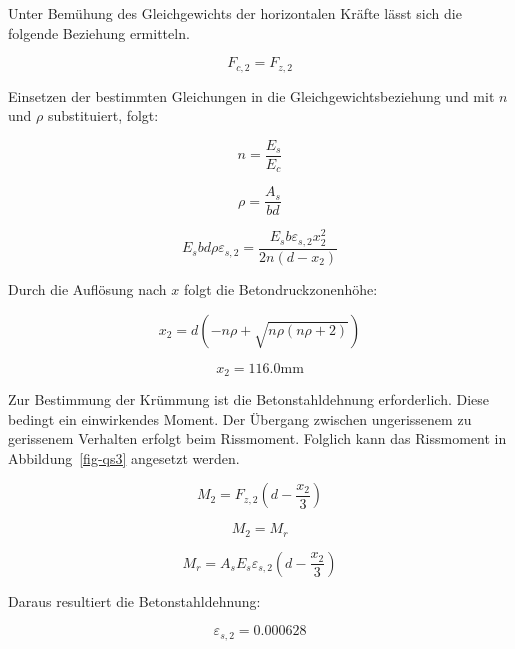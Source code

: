 \documentclass[
  letterpaper,
]{scrreprt}
\begin{document}
Unter Bemühung des Gleichgewichts der horizontalen Kräfte lässt sich die
folgende Beziehung ermitteln.

\begin{equation}F_{c,2} = F_{z,2}\end{equation}

Einsetzen der bestimmten Gleichungen in die Gleichgewichtsbeziehung und
mit \(n\) und \(\rho\) substituiert, folgt:

\begin{equation}n = \frac{E_{s}}{E_{c}}\end{equation}

\begin{equation}\rho = \frac{A_{s}}{b d}\end{equation}

\begin{equation}E_{s} b d \rho \varepsilon_{s,2} = \frac{E_{s} b \varepsilon_{s,2} x_{2}^{2}}{2 n \left(d - x_{2}\right)}\end{equation}

Durch die Auflösung nach \(x\) folgt die Betondruckzonenhöhe:

\begin{equation}x_{2} = d \left(- n \rho + \sqrt{n \rho \left(n \rho + 2\right)}\right)\end{equation}

\begin{equation}x_{2} = 116.0 \text{mm}\end{equation}

Zur Bestimmung der Krümmung ist die Betonstahldehnung erforderlich.
Diese bedingt ein einwirkendes Moment. Der Übergang zwischen
ungerissenem zu gerissenem Verhalten erfolgt beim Rissmoment. Folglich
kann das Rissmoment in Abbildung~\ref{fig-qs3} angesetzt werden.

\begin{equation}M_{2} = F_{z,2} \left(d - \frac{x_{2}}{3}\right)\end{equation}

\begin{equation}M_{2} = M_{r}\end{equation}

\begin{equation}M_{r} = A_{s} E_{s} \varepsilon_{s,2} \left(d - \frac{x_{2}}{3}\right)\end{equation}

Daraus resultiert die Betonstahldehnung:

\begin{equation}\varepsilon_{s,2} = 0.000628\end{equation}
\end{document}
